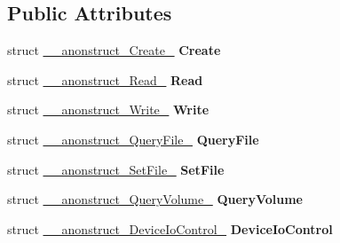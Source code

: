 \subsection*{Public Attributes}
\begin{DoxyCompactItemize}
\item 
\hypertarget{union____anonunion__Parameters__55_afda874deba965b478bbd0d886e1514ea}{}struct \hyperlink{struct____anonstruct__Create__56}{\+\_\+\+\_\+anonstruct\+\_\+\+Create\+\_} {\bfseries Create}\label{union____anonunion__Parameters__55_afda874deba965b478bbd0d886e1514ea}

\item 
\hypertarget{union____anonunion__Parameters__55_a8ceca63f8a70233f129040a2e361d82c}{}struct \hyperlink{struct____anonstruct__Read__57}{\+\_\+\+\_\+anonstruct\+\_\+\+Read\+\_} {\bfseries Read}\label{union____anonunion__Parameters__55_a8ceca63f8a70233f129040a2e361d82c}

\item 
\hypertarget{union____anonunion__Parameters__55_adcf85f6629c16a055e19e72135ee1398}{}struct \hyperlink{struct____anonstruct__Write__58}{\+\_\+\+\_\+anonstruct\+\_\+\+Write\+\_} {\bfseries Write}\label{union____anonunion__Parameters__55_adcf85f6629c16a055e19e72135ee1398}

\item 
\hypertarget{union____anonunion__Parameters__55_a2089779ddbf1f217a7942325f41a807a}{}struct \hyperlink{struct____anonstruct__QueryFile__59}{\+\_\+\+\_\+anonstruct\+\_\+\+Query\+File\+\_} {\bfseries Query\+File}\label{union____anonunion__Parameters__55_a2089779ddbf1f217a7942325f41a807a}

\item 
\hypertarget{union____anonunion__Parameters__55_a2a6e16f6d2579ab21e5034281ace9961}{}struct \hyperlink{struct____anonstruct__SetFile__60}{\+\_\+\+\_\+anonstruct\+\_\+\+Set\+File\+\_} {\bfseries Set\+File}\label{union____anonunion__Parameters__55_a2a6e16f6d2579ab21e5034281ace9961}

\item 
\hypertarget{union____anonunion__Parameters__55_a191ac578382846c6d910e8f178c7e7a8}{}struct \hyperlink{struct____anonstruct__QueryVolume__63}{\+\_\+\+\_\+anonstruct\+\_\+\+Query\+Volume\+\_} {\bfseries Query\+Volume}\label{union____anonunion__Parameters__55_a191ac578382846c6d910e8f178c7e7a8}

\item 
\hypertarget{union____anonunion__Parameters__55_a01d49068010ba89d2bff84553cdebc1f}{}struct \hyperlink{struct____anonstruct__DeviceIoControl__64}{\+\_\+\+\_\+anonstruct\+\_\+\+Device\+Io\+Control\+\_} {\bfseries Device\+Io\+Control}\label{union____anonunion__Parameters__55_a01d49068010ba89d2bff84553cdebc1f}


\end{DoxyCompactItemize}
